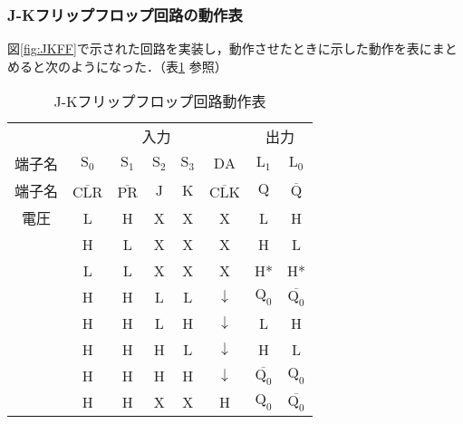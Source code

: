 %
%
\subsubsection{J-Kフリップフロップ回路の動作表}
\label{JKFF_explain}
図\ref{fig:JKFF}で示された回路を実装し，動作させたときに示した動作を表にまとめると次のようになった．（表\ref{tab:JKFF_dousahyoutab} 参照）

\begin {table}[ht]
	\begin {center}
		\caption {J-Kフリップフロップ回路動作表}%
		\begin {tabular}{c|ccccc|cc}\hline
			\multicolumn{1}{c|}{}&%
			\multicolumn{5}{c}{入力}&%
			\multicolumn{2}{|c}{出力}\\ %
			\multicolumn{1}{c|}{端子名}&%
			\multicolumn{1}{c}{$\mathrm{S_0}$}&
			\multicolumn{1}{c}{$\mathrm{S_1}$}&
			\multicolumn{1}{c}{$\mathrm{S_2}$}&
			\multicolumn{1}{c}{$\mathrm{S_3}$}&
			\multicolumn{1}{c}{$\mathrm{DA}$}&
			\multicolumn{1}{|c}{$\mathrm{L_1}$}&
			\multicolumn{1}{c}{$\mathrm{L_0}$}\\
			\hline
			\multicolumn{1}{c|}{端子名}&%
			\multicolumn{1}{c}{$\overline{\mathrm{CLR}}$}&
			\multicolumn{1}{c}{$\overline{\mathrm{PR}}$}&
			\multicolumn{1}{c}{$\mathrm{J}$}&
			\multicolumn{1}{c}{$\mathrm{K}$}&
			\multicolumn{1}{c}{$\overline{\mathrm{CLK}}$}&
			\multicolumn{1}{|c}{$\mathrm{Q}$}&
			\multicolumn{1}{c}{$\overline{\mathrm{Q}}$}\\
			\hline
			電圧
			&	L	&	H	&	X	&	X	&	X	&	L	&	H	\\
			&	H	&	L	&	X	&	X	&	X	&	H	&	L	\\
			&	L	&	L	&	X	&	X	&	X	&	H*	&	H*	\\
			&	H	&	H	&	L	&	L	&	$\downarrow$	&	$\mathrm{Q_0}$	&	$\overline{\mathrm{Q_0}}$	\\
			&	H	&	H	&	L	&	H	&	$\downarrow$	&	L	&	H	\\
			&	H	&	H	&	H	&	L	&	$\downarrow$	&	H	&	L	\\
			&	H	&	H	&	H	&	H	&	$\downarrow$	&	$\overline{\mathrm{Q_0}}$	&	$\mathrm{Q_0}$	\\
			&	H	&	H	&	X	&	X	&	H	&	$\mathrm{Q_0}$	&	$\overline{\mathrm{Q_0}}$	\\			\hline
		\end{tabular}
		\label {tab:JKFF_dousahyoutab}%
	\end{center}
\end{table}

